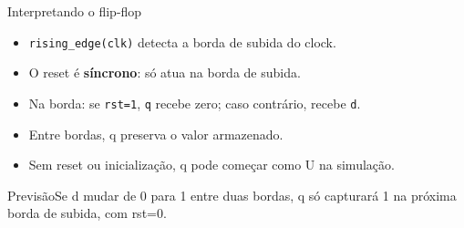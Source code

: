 \begin{frame}[t]{Interpretando o flip-flop}
\begin{itemize}
\item \texttt{rising\_edge(clk)} detecta a borda de subida do clock.
\item O reset é \textbf{síncrono}: só atua na borda de subida.
\item Na borda: se \texttt{rst=1}, \texttt{q} recebe zero; caso contrário, recebe \texttt{d}.
\item Entre bordas, q preserva o valor armazenado.
\item Sem reset ou inicialização, q pode começar como U na simulação.
\end{itemize}\begin{exampleblock}{Previsão}Se d mudar de 0 para 1 entre duas bordas, q só capturará 1 na próxima borda de subida, com rst=0.\end{exampleblock}
\end{frame}
